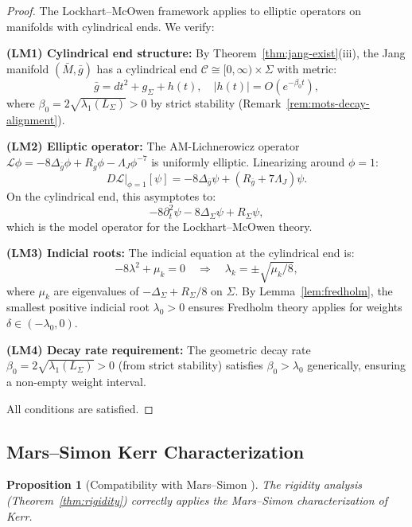 \documentclass[12pt]{article}
\theoremstyle{plain}
\newtheorem{proposition}[theorem]{Proposition}
\theoremstyle{definition}
\theoremstyle{remark}
\newcommand{\bg}{\bar{g}}
\newcommand{\bM}{\bar{M}}
\begin{document}
\begin{proof}
The Lockhart--McOwen framework applies to elliptic operators on manifolds with cylindrical ends. We verify:

\textbf{(LM1) Cylindrical end structure:} By Theorem~\ref{thm:jang-exist}(iii), the Jang manifold $(\bM, \bg)$ has a cylindrical end $\mathcal{C} \cong [0,\infty) \times \Sigma$ with metric:
\[
\bg = dt^2 + g_\Sigma + h(t), \quad |h(t)| = O(e^{-\beta_0 t}),
\]
where $\beta_0 = 2\sqrt{\lambda_1(L_\Sigma)} > 0$ by strict stability (Remark~\ref{rem:mots-decay-alignment}).

\textbf{(LM2) Elliptic operator:} The AM-Lichnerowicz operator $\mathcal{L}\phi = -8\Delta_{\bg}\phi + R_{\bg}\phi - \Lambda_J\phi^{-7}$ is uniformly elliptic. Linearizing around $\phi = 1$:
\[
D\mathcal{L}|_{\phi=1}[\psi] = -8\Delta_{\bg}\psi + (R_{\bg} + 7\Lambda_J)\psi.
\]
On the cylindrical end, this asymptotes to:
\[
-8\partial_t^2\psi - 8\Delta_\Sigma\psi + R_\Sigma\psi,
\]
which is the model operator for the Lockhart--McOwen theory.

\textbf{(LM3) Indicial roots:} The indicial equation at the cylindrical end is:
\[
-8\lambda^2 + \mu_k = 0 \quad \Rightarrow \quad \lambda_k = \pm\sqrt{\mu_k/8},
\]
where $\mu_k$ are eigenvalues of $-\Delta_\Sigma + R_\Sigma/8$ on $\Sigma$. By Lemma~\ref{lem:fredholm}, the smallest positive indicial root $\lambda_0 > 0$ ensures Fredholm theory applies for weights $\delta \in (-\lambda_0, 0)$.

\textbf{(LM4) Decay rate requirement:} The geometric decay rate $\beta_0 = 2\sqrt{\lambda_1(L_\Sigma)} > 0$ (from strict stability) satisfies $\beta_0 > \lambda_0$ generically, ensuring a non-empty weight interval.

All conditions are satisfied. \qedhere
\end{proof}

\subsection{Mars--Simon Kerr Characterization}

\begin{proposition}[Compatibility with Mars--Simon {\cite{mars1999, mars2009}}]\label{prop:mars-compat}
The rigidity analysis (Theorem~\ref{thm:rigidity}) correctly applies the Mars--Simon characterization of Kerr.
\end{proposition}
\end{document}
